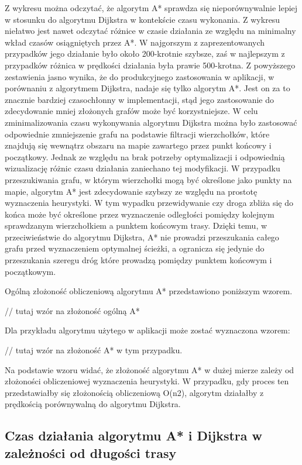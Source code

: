 Z wykresu można odczytać, że algorytm A* sprawdza się nieporównywalnie lepiej w stosunku do algorytmu Dijkstra w kontekście czasu wykonania. Z wykresu niełatwo jest nawet odczytać różnice w czasie działania ze względu na minimalny wkład czasów osiągniętych przez A*. W najgorszym z zaprezentowanych przypadków jego działanie było około 200-krotnie szybsze, zaś w najlepszym z przypadków różnica w prędkości działania była prawie 500-krotna. Z powyższego zestawienia jasno wynika, że do produkcyjnego zastosowania w aplikacji, w porównaniu z algorytmem Dijkstra, nadaje się tylko algorytm A*. Jest on za to znacznie bardziej czasochłonny w implementacji, stąd jego zastosowanie do zdecydowanie mniej złożonych grafów może być korzystniejsze. W celu zminimalizowania czasu wykonywania algorytmu Dijkstra można było zastosować odpowiednie zmniejszenie grafu na podstawie filtracji wierzchołków, które znajdują się wewnątrz obszaru na mapie zawartego przez punkt końcowy i początkowy. Jednak ze względu na brak potrzeby optymalizacji i odpowiednią wizualizację różnic czasu działania zaniechano tej modyfikacji.
W przypadku przeszukiwania grafu, w którym wierzchołki mogą być określone jako punkty na mapie, algorytm A* jest zdecydowanie szybszy ze względu na prostotę wyznaczenia heurystyki. W tym wypadku przewidywanie czy droga zbliża się do końca może być określone przez wyznaczenie odległości pomiędzy kolejnym sprawdzanym wierzchołkiem a punktem końcowym trasy. Dzięki temu, w przeciwieństwie do algorytmu Dijkstra, A* nie prowadzi przeszukania całego grafu przed wyznaczeniem optymalnej ścieżki, a ogranicza się jedynie do przeszukania szeregu dróg które prowadzą pomiędzy punktem końcowym i początkowym. \newline

Ogólną złożoność obliczeniową algorytmu A* przedstawiono poniższym wzorem.

// tutaj wzór na złożoność ogólną A*

Dla przykładu algorytmu użytego w aplikacji może zostać wyznaczona wzorem:

// tutaj wzór na złożoność A* w tym przypadku.

Na podstawie wzoru widać, że złożoność algorytmu A* w dużej mierze zależy od złożoności obliczeniowej wyznaczenia heurystyki. W przypadku, gdy proces ten przedstawiałby się złożonością obliczeniową O(n2), algorytm działałby z prędkością porównywalną do algorytmu Dijkstra.

\subsection{Czas działania algorytmu A* i Dijkstra w zależności od długości trasy}

